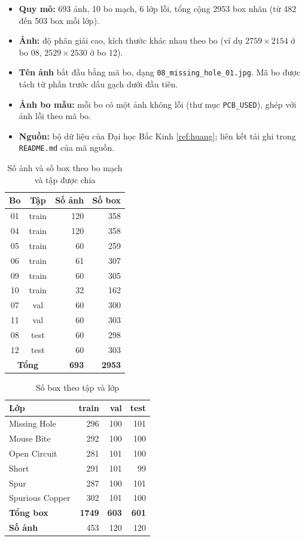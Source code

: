 \documentclass[11pt,a4paper]{article}
\newcommand{\tlr}[1]{\ref{ref:#1}}
\begin{document}
\begin{itemize}
  \item \textbf{Quy mô:} 693 ảnh, 10 bo mạch, 6 lớp lỗi, tổng cộng 2953 box nhãn (từ 482 đến 503 box mỗi lớp).
  \item \textbf{Ảnh:} độ phân giải cao, kích thước khác nhau theo bo (ví dụ $2759\times2154$ ở bo 08, $2529\times2530$ ở bo 12).
  \item \textbf{Tên ảnh} bắt đầu bằng mã bo, dạng \texttt{08\_missing\_hole\_01.jpg}. Mã bo được tách từ phần trước dấu gạch dưới đầu tiên.
  \item \textbf{Ảnh bo mẫu:} mỗi bo có một ảnh không lỗi (thư mục \texttt{PCB\_USED}), ghép với ảnh lỗi theo mã bo.
  \item \textbf{Nguồn:} bộ dữ liệu của Đại học Bắc Kinh \tlr{huang}; liên kết tải ghi trong \texttt{README.md} của mã nguồn.
\end{itemize}

\begin{table}[H]
\centering
\small
\caption{Số ảnh và số box theo bo mạch và tập được chia}\label{tab:phanbo}
\begin{tabular}{ccrr}
\toprule
\textbf{Bo} & \textbf{Tập} & \textbf{Số ảnh} & \textbf{Số box} \\ \midrule
01 & train & 120 & 358 \\
04 & train & 120 & 358 \\
05 & train & 60 & 259 \\
06 & train & 61 & 307 \\
09 & train & 60 & 305 \\
10 & train & 32 & 162 \\ \midrule
07 & val & 60 & 300 \\
11 & val & 60 & 303 \\ \midrule
08 & test & 60 & 298 \\
12 & test & 60 & 303 \\ \midrule
\multicolumn{2}{c}{\textbf{Tổng}} & \textbf{693} & \textbf{2953} \\ \bottomrule
\end{tabular}
\end{table}

\begin{table}[H]
\centering
\small
\caption{Số box theo tập và lớp}\label{tab:boxlop}
\begin{tabular}{lrrr}
\toprule
\textbf{Lớp} & \textbf{train} & \textbf{val} & \textbf{test} \\ \midrule
Missing Hole & 296 & 100 & 101 \\
Mouse Bite & 292 & 100 & 100 \\
Open Circuit & 281 & 101 & 100 \\
Short & 291 & 101 & 99 \\
Spur & 287 & 100 & 101 \\
Spurious Copper & 302 & 101 & 100 \\ \midrule
\textbf{Tổng box} & \textbf{1749} & \textbf{603} & \textbf{601} \\
\textbf{Số ảnh} & 453 & 120 & 120 \\ \bottomrule
\end{tabular}
\end{table}
\end{document}
